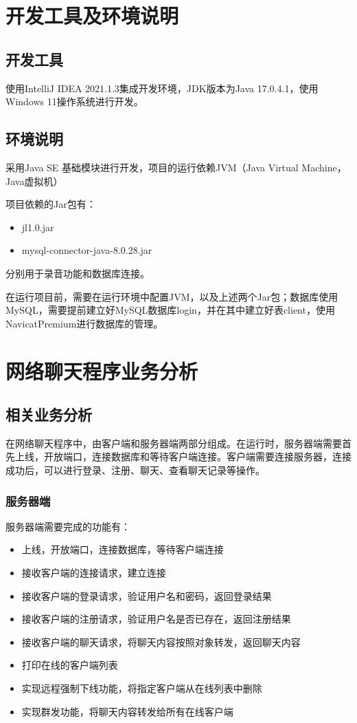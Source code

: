 \documentclass[UTF8,12pt]{article}
\begin{document}
\begin{center}
    \tableofcontents
\end{center}
\newpage

\section{开发工具及环境说明}
\subsection{开发工具}
使用IntelliJ IDEA 2021.1.3集成开发环境，JDK版本为Java 17.0.4.1，使用Windows 11操作系统进行开发。

\subsection{环境说明}
采用Java SE 基础模块进行开发，项目的运行依赖JVM（Java Virtual Machine，Java虚拟机）

项目依赖的Jar包有：

\begin{itemize}
    \item jl1.0.jar
    \item mysql-connector-java-8.0.28.jar
\end{itemize}

分别用于录音功能和数据库连接。

在运行项目前，需要在运行环境中配置JVM，以及上述两个Jar包；数据库使用MySQL，需要提前建立好MySQL数据库login，并在其中建立好表client，使用NavicatPremium进行数据库的管理。
\newpage

\section{网络聊天程序业务分析}
\subsection{相关业务分析}
在网络聊天程序中，由客户端和服务器端两部分组成。在运行时，服务器端需要首先上线，开放端口，连接数据库和等待客户端连接。客户端需要连接服务器，连接成功后，可以进行登录、注册、聊天、查看聊天记录等操作。

\subsubsection{服务器端}
服务器端需要完成的功能有：
\begin{itemize}
    \item 上线，开放端口，连接数据库，等待客户端连接
    \item 接收客户端的连接请求，建立连接
    \item 接收客户端的登录请求，验证用户名和密码，返回登录结果
    \item 接收客户端的注册请求，验证用户名是否已存在，返回注册结果
    \item 接收客户端的聊天请求，将聊天内容按照对象转发，返回聊天内容
    \item 打印在线的客户端列表
    \item 实现远程强制下线功能，将指定客户端从在线列表中删除
    \item 实现群发功能，将聊天内容转发给所有在线客户端
\end{itemize}
\end{document}
